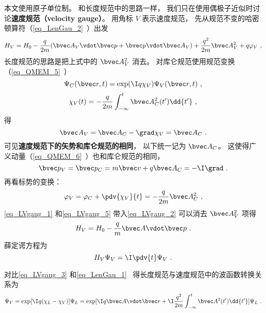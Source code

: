 

本文使用原子单位制。 和长度规范中的思路一样， 我们只在使用偶极子近似时讨论\textbf{速度规范（velocity gauge）}。 用角标 $V$ 表示速度规范， 先从规范不变的哈密顿算符（\autoref{eq_LenGau_2}~）出发
\begin{equation}\label{eq_LVgaug_2}
H_V = H_0 - \frac{q}{2m} (\bvec A_V \vdot \bvec p + \bvec p \vdot \bvec A_V)
+ \frac{q^2}{2m} \bvec A_V^2 + q \varphi_V~,
\end{equation}
长度规范的思路是把上式中的 $\bvec A_V^2$ 消去。 对库仑规范使用规范变换（\autoref{eq_QMEM_5}~）
\begin{equation}\label{eq_LVgaug_3}
\Psi_C(\bvec r, t) = \exp(\I q\chi_V)\Psi_V(\bvec r, t)~,
\end{equation}
\begin{equation}\label{eq_LVgaug_4}
\chi_V(t) = -\frac{q}{2m} \int_{-\infty}^t \bvec A_C^2(t') \dd{t'}~,
\end{equation}
得
\begin{equation}\label{eq_LVgaug_1}
\bvec A_V = \bvec A_C - \grad \chi_V = \bvec A_C~.
\end{equation}
可见\textbf{速度规范下的矢势和库仑规范的相同}， 以下统一记为 $\bvec A_C$。 这使得广义动量（\autoref{eq_QMEM_6}~）也和库仑规范的相同， 
\begin{equation}
\bvec p_V = \bvec p_C =  m \bvec v + q\bvec A_{C} = -\I \grad~.
\end{equation}
再看标势的变换：
\begin{equation}\label{eq_LVgaug_5}
\varphi_V = \varphi_C + \pdv{\chi_V}{t} = - \frac{q}{2m} \bvec A_C^2~,
\end{equation}
\autoref{eq_LVgaug_1} 和\autoref{eq_LVgaug_5} 带入\autoref{eq_LVgaug_2} 可以消去 $\bvec A_V^2$ 项得
\begin{equation}
H_V = H_0 - \frac{q}{m} \bvec A \vdot \bvec p~.
\end{equation}
薛定谔方程为
\begin{equation}\label{eq_LVgaug_7}
H_V \Psi_V = \I \pdv{t} \Psi_V~.
\end{equation}


对比\autoref{eq_LVgaug_3} 和\autoref{eq_LenGau_1}~ 得长度规范与速度规范中的波函数转换关系为
\begin{equation}\label{eq_LVgaug_6}
\Psi_V = \exp[\I q(\chi_L - \chi_V)]\Psi_L = \exp[\I q \bvec A\vdot \bvec r + \I\frac{q^2}{2m}\int_{-\infty}^t \bvec A^2(t')\dd{t'}] \Psi_L~.
\end{equation}
